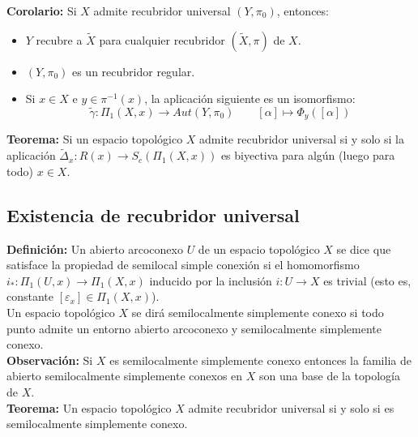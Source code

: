 \documentclass{article}
\begin{document}
\textbf{Corolario:} Si $X$ admite recubridor universal $(Y,\pi_0)$, entonces:
\begin{itemize}
\item $Y$ recubre a $\tilde{X}$ para cualquier recubridor $(\tilde{X},\pi)$ de $X$.

\item $(Y,\pi_0)$ es un recubridor regular.

\item Si $x\in X$ e $y\in \pi^{-1}(x)$, la aplicación siguiente es un isomorfismo:
\begin{equation*}
\tilde{\gamma}:\Pi_1(X,x)\rightarrow Aut(Y,\pi_0)\qquad [\alpha]\mapsto \Phi_y([\alpha])
\end{equation*}
\end{itemize}

\textbf{Teorema:} Si un espacio topológico $X$ admite recubridor universal si y solo si la aplicación $\tilde{\Delta}_x:R(x)\rightarrow S_c(\Pi_1(X,x))$ es biyectiva para algún (luego para todo) $x\in X$. 

\subsection{Existencia de recubridor universal}
\textbf{Definición:} Un abierto arcoconexo $U$ de un espacio topológico $X$ se dice que satisface la propiedad de semilocal simple conexión si el homomorfismo $i_*:\Pi_1(U,x)\rightarrow \Pi_1(X,x)$ inducido por la inclusión $i:U\rightarrow X$ es trivial (esto es, constante $[\varepsilon_x]\in \Pi_1(X,x)$).\\

Un espacio topológico $X$ se dirá semilocalmente simplemente conexo si todo punto admite un entorno abierto arcoconexo y semilocalmente simplemente conexo.\\

\textbf{Observación:} Si $X$ es semilocalmente simplemente conexo entonces la familia de abierto semilocalmente simplemente conexos en $X$ son una base de la topología de $X$. \\

\textbf{Teorema:} Un espacio topológico $X$ admite recubridor universal si y solo si es semilocalmente simplemente conexo.
\end{document}
